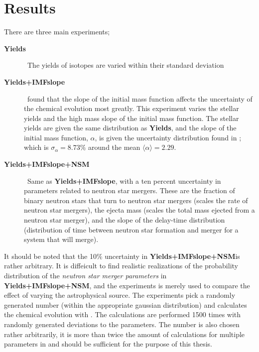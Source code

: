 \chapter{Results}
\label{sec:results}

\newcommand\expone{\textbf{Yields}}
\newcommand\exptwo{\textbf{Yields+IMFslope}}
\newcommand\expthree{\textbf{Yields+IMFslope+NSM}}
There are three main experiments;
\begin{description}
\item[\expone] \, The yields of isotopes are varied within their standard deviation 
\item[\exptwo] \,  found that the slope of the initial mass function affects the uncertainty of the chemical evolution most greatly. This experiment varies the stellar yields and the high mass slope of the initial mass function. The stellar yields are given the same distribution as \expone, and the slope of the initial mass function, $\alpha$, is given the uncertainty distribution found in ; which is $\sigma_{\alpha}=8.73\%$ around the mean $\langle \alpha \rangle = 2.29$.
\item[\expthree] \, Same as \exptwo, with a ten percent uncertainty in parameters related to neutron star mergers. These are the fraction of binary neutron stars that turn to neutron star mergers (scales the rate of neutron star mergers), the ejecta mass (scales the total mass ejected from a neutron star merger), and the slope of the delay-time distribution (distribution of time between neutron star formation and merger for a system that will merge).
\end{description}
It should be noted that the 10\% uncertainty in \expthree is rather arbitrary.
It is diffeicult to find realistic realizations of the probability distribution of the \textit{neutron star merger parameters} in \expthree, and the experiments is merely used to compare the effect of varying the astrophysical source.
The experiments pick a randomly generated number (within the appropriate gaussian distribution) and calculates the chemical evolution with \omegamodel.
The calculations are performed 1500 times with randomly generated deviations to the parameters.
The number is also chosen rather arbitrarily, it is more than twice the amount of calculations for multiple parameters in  and should be sufficient for the purpose of this thesis.

